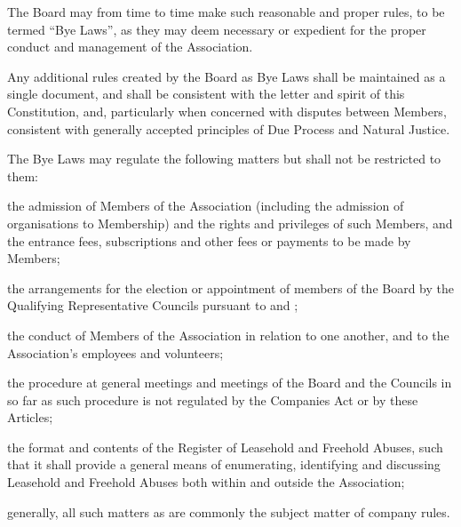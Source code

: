 \documentclass[10pt]{mk-articles-of-association}
\newcommand{\EC}[0]{Board}
\newcommand{\Exec}[0]{\EC{} }
\newcommand{\LAFA}[0]{Leasehold and Freehold Abuses}
\begin{document}
\begin{constenum}

\item The \Exec may from time to time make such reasonable and proper
  rules, to be termed ``Bye Laws'', as they may deem necessary or
  expedient for the proper conduct and management of the Association.

\item Any additional rules created by the \Exec as Bye Laws
  shall be maintained as a single document, and shall be
  consistent with the letter and spirit of this Constitution, and,
  particularly when concerned with disputes between Members,
  consistent with generally accepted principles of Due Process and
  Natural Justice.

\item The Bye Laws may regulate the following matters but shall not be
  restricted to them:

\begin{constenum}

\item the admission of Members of the Association (including the admission
  of organisations to Membership) and the rights and privileges of
  such Members, and the entrance fees, subscriptions and other fees or
  payments to be made by Members;

\item the arrangements for the election or appointment of members of
  the \Exec by the Qualifying Representative Councils pursuant to
   and ;

\item the conduct of Members of the Association in relation to one
  another, and to the Association's employees and volunteers;

\item the procedure at general meetings and meetings of the \Exec and
  the Councils in so far as such procedure is not regulated by the
  Companies Act or by these Articles;

\item the format and contents of the Register of \LAFA, such that
  it shall provide a general means of enumerating, identifying and
  discussing \LAFA{} both within and outside the Association; \ITand

\item generally, all such matters as are commonly the subject matter
  of company rules.

\end{constenum}


\end{constenum}
\end{document}
